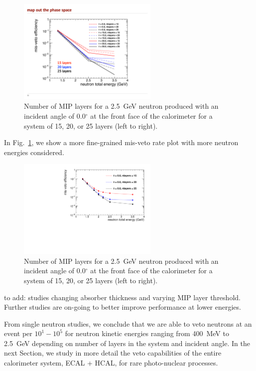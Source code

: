 \begin{figure}[hbtp]
\begin{center}
    \includegraphics[width=0.6\textwidth]{images/hcal/effmap1.pdf}
    \caption{Number of MIP layers for a 2.5~GeV neutron produced with an incident angle of 0.0$^{\circ}$ at the front face of the calorimeter for a system of 15, 20, or 25 layers (left to right). }
 \label{fig:effmap1}
 \end{center}
\end{figure}

In Fig.~\ref{fig:effmap1}, we show a more fine-grained mis-veto rate plot with more neutron energies considered.

\begin{figure}[hbtp]
\begin{center}
    \includegraphics[width=0.6\textwidth]{images/hcal/effmap2.pdf}
    \caption{Number of MIP layers for a 2.5~GeV neutron produced with an incident angle of 0.0$^{\circ}$ at the front face of the calorimeter for a system of 15, 20, or 25 layers (left to right). }
 \label{fig:nmiplayer1d3}
 \end{center}
\end{figure}


{\color{red} to add: studies changing absorber thickness and varying MIP layer threshold. Further studies are on-going to better improve performance at lower energies. }

From single neutron studies, we conclude that we are able to veto neutrons at an event per $10^1 - 10^5$ for neutron kinetic energies ranging from 400~MeV to 2.5~GeV 
depending on number of layers in the system and incident angle.  
In the next Section, we study in more detail the veto capabilities of the entire calorimeter system, ECAL + HCAL, for rare photo-nuclear processes.


